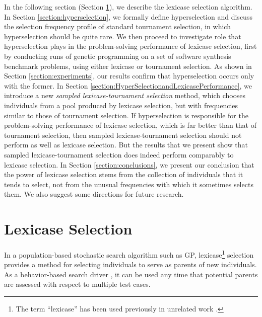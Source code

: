 \documentclass{sig-alternate}
\begin{document}
In the following section (Section \ref{section:lexicase}), we  describe the lexicase selection algorithm. In Section \ref{section:hyperselection}, we formally define hyperselection and discuss the selection frequency profile of standard tournament selection, in which hyperselection should be quite rare. We then proceed to investigate role that hyperselection plays in the problem-solving performance of lexicase selection, first by conducting runs of genetic programming on a set of software synthesis benchmark problems, using either lexicase or tournament selection. As shown in Section \ref{section:experiments}, our results confirm that hyperselection occurs only with the former. In Section \ref{section:HyperSelectionandLexicasePerformance}, we introduce a new \emph{sampled lexicase-tournament selection} method, which chooses individuals from a pool produced by lexicase selection, but with frequencies similar to those of tournament selection. If hyperselection is responsible for the problem-solving performance of lexicase selection, which is far better than that of tournament selection, then sampled lexicase-tournament selection should not perform as well as lexicase selection. But the results that we present show that sampled lexicase-tournament selection does indeed perform comparably to lexicase selection. In Section \ref{section:conclusions}, we present our conclusion that the power of lexicase selection stems from the collection of individuals that it tends to select, not from the unusual frequencies with which it sometimes selects them. We also suggest some directions for future research.





\section{Lexicase Selection}
\label{section:lexicase}



In a population-based stochastic search algorithm such as GP, lexicase\footnote{The term ``lexicase'' has been used previously in unrelated work \cite{Starosta:1986:LPL:991365.991400, starosta1988case}.} selection provides a method for selecting individuals to serve as parents of new individuals. As a behavior-based search driver \cite{Krawiec:2015:GPTP}, it can be used any time that potential parents are assessed with respect to multiple test cases.
\end{document}

